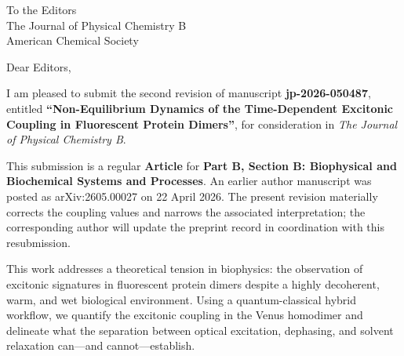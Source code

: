 \documentclass[11pt]{letter}
\begin{document}
\begin{letter}{
    To the Editors \\
    The Journal of Physical Chemistry B \\
    American Chemical Society
}

\opening{Dear Editors,}

I am pleased to submit the second revision of manuscript \textbf{jp-2026-050487}, entitled \textbf{``Non-Equilibrium Dynamics of the Time-Dependent Excitonic Coupling in Fluorescent Protein Dimers''}, for consideration in \textit{The Journal of Physical Chemistry B}.

This submission is a regular \textbf{Article} for \textbf{Part B, Section B: Biophysical and Biochemical Systems and Processes}. An earlier author manuscript was posted as arXiv:2605.00027 on 22 April 2026. The present revision materially corrects the coupling values and narrows the associated interpretation; the corresponding author will update the preprint record in coordination with this resubmission.

This work addresses a theoretical tension in biophysics: the observation of excitonic signatures in fluorescent protein dimers despite a highly decoherent, warm, and wet biological environment. Using a quantum-classical hybrid workflow, we quantify the excitonic coupling in the Venus homodimer and delineate what the separation between optical excitation, dephasing, and solvent relaxation can---and cannot---establish.


\end{letter}
\end{document}
